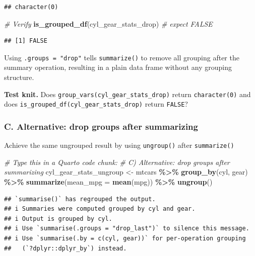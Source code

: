 \documentclass[
]{article}
\newenvironment{Shaded}{\begin{snugshade}}{\end{snugshade}}
\newcommand{\AttributeTok}[1]{\textcolor[rgb]{0.13,0.29,0.53}{#1}}
\newcommand{\CommentTok}[1]{\textcolor[rgb]{0.56,0.35,0.01}{\textit{#1}}}
\newcommand{\FunctionTok}[1]{\textcolor[rgb]{0.13,0.29,0.53}{\textbf{#1}}}
\newcommand{\NormalTok}[1]{#1}
\newcommand{\OtherTok}[1]{\textcolor[rgb]{0.56,0.35,0.01}{#1}}
\newcommand{\SpecialCharTok}[1]{\textcolor[rgb]{0.81,0.36,0.00}{\textbf{#1}}}
\begin{document}
\begin{verbatim}
## character(0)
\end{verbatim}

\begin{Shaded}
\begin{Highlighting}[]
\CommentTok{\#  Verify}
\FunctionTok{is\_grouped\_df}\NormalTok{(cyl\_gear\_stats\_drop) }\CommentTok{\# expect FALSE}
\end{Highlighting}
\end{Shaded}

\begin{verbatim}
## [1] FALSE
\end{verbatim}

Using \texttt{.groups\ =\ "drop"} tells \texttt{summarize()} to remove
all grouping after the summary operation, resulting in a plain data
frame without any grouping structure.

\textbf{Test knit.} Does \texttt{group\_vars(cyl\_gear\_stats\_drop)}
return \texttt{character(0)} and does
\texttt{is\_grouped\_df(cyl\_gear\_stats\_drop)} return \texttt{FALSE}?

\subsubsection{C. Alternative: drop groups after
summarizing}\label{c.-alternative-drop-groups-after-summarizing}

Achieve the same ungrouped result by using \texttt{ungroup()} after
\texttt{summarize()}

\begin{Shaded}
\begin{Highlighting}[]
\CommentTok{\#  Type this in a Quarto code chunk:}
\CommentTok{\# C) Alternative: drop groups after summarizing}
\NormalTok{cyl\_gear\_stats\_ungroup }\OtherTok{\textless{}{-}}\NormalTok{ mtcars }\SpecialCharTok{\%\textgreater{}\%}
  \FunctionTok{group\_by}\NormalTok{(cyl, gear) }\SpecialCharTok{\%\textgreater{}\%}
  \FunctionTok{summarize}\NormalTok{(}\AttributeTok{mean\_mpg =} \FunctionTok{mean}\NormalTok{(mpg)) }\SpecialCharTok{\%\textgreater{}\%}
  \FunctionTok{ungroup}\NormalTok{()}
\end{Highlighting}
\end{Shaded}

\begin{verbatim}
## `summarise()` has regrouped the output.
## i Summaries were computed grouped by cyl and gear.
## i Output is grouped by cyl.
## i Use `summarise(.groups = "drop_last")` to silence this message.
## i Use `summarise(.by = c(cyl, gear))` for per-operation grouping
##   (`?dplyr::dplyr_by`) instead.
\end{verbatim}
\end{document}
